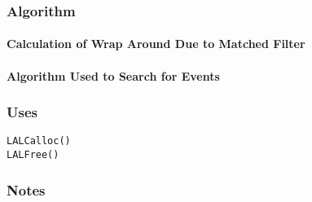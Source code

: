 \subsubsection*{Algorithm}

\paragraph*{Calculation of Wrap Around Due to Matched Filter}

\paragraph*{Algorithm Used to Search for Events}

\subsubsection*{Uses}
\begin{verbatim}
LALCalloc()
LALFree()
\end{verbatim}

\subsubsection*{Notes}

